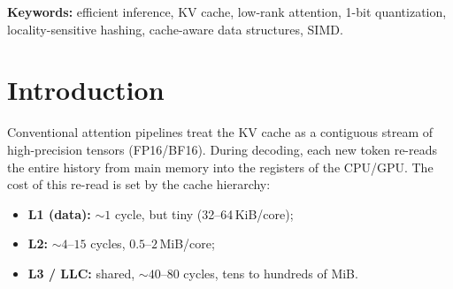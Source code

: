 \documentclass[11pt]{article}
\newcommand{\added}[1]{\textcolor{revisionblue}{#1}}
\newcommand{\deleted}[1]{\textcolor{revisionred}{#1}}
\theoremstyle{plain}
\theoremstyle{definition}
\begin{document}
\begin{abstract}
that lifts \textsc{warm} Spearman from $0.16$ to $0.86$ under query/key
distribution shift. A controlled ablation shows that quantization width
is \emph{not} the bottleneck (an INT8 reference does not beat INT4 on the
coarse term)---the low-rank projection is.
\added{Subsequent real-model evaluation materially revises the June draft.
On Qwen2.5-1.5B-Instruct Q8\_0 with WikiText-2 (12 chunks, context 512),
strict compressed-score replacement raised mean perplexity from 11.8831
for the matched no-substitution control to 16.9173 (+42.36\%), so that
configuration is an explicit end-to-end NO-GO. On a separate 24.41M
parameter TinyStories model with physical external-K CCOS, a repository-authored
two-chunk held-out control measured 42.201 baseline perplexity versus
49.0024 (+16.12\%) under SLHA/CCOS, with full active replacement coverage
and no fallback. A non-deployable rank-transplant diagnostic then showed
that restoring baseline key ordering while retaining SLHA score values
recovers 65.9\% of the Qwen quality gap; restoring only the baseline top-16
ordering captures 98.42\% of that oracle recovery.}
We position SLHA~v2 as a validated \emph{mechanism} and a systems substrate,
\deleted{and we are explicit about what remains unmeasured: real-model
perplexity, hardware cache counters, and joint projection training.}
\added{but no longer as a system whose synthetic fidelity proxies justify
end-to-end quality: real-model perplexity is now measured and currently
rejects the tested score-replacement configurations. Hardware cache counters,
production-scale GPU behavior, and a deployable ranking-preserving projection
remain open.}
\end{abstract}

\noindent\textbf{Keywords:} efficient inference, KV cache, low-rank
attention, 1-bit quantization, locality-sensitive hashing, cache-aware
data structures, SIMD.

\section{Introduction}
\label{sec:intro}

Conventional attention pipelines treat the KV cache as a contiguous
stream of high-precision tensors (FP16/BF16). During decoding, each new
token re-reads the entire history from main memory into the registers of
the CPU/GPU. The cost of this re-read is set by the cache hierarchy:

\begin{itemize}[leftmargin=1.4em,itemsep=2pt]
  \item \textbf{L1 (data):} $\sim\!1$ cycle, but tiny (32--64\,KiB/core);
  \item \textbf{L2:} $\sim\!4$--$15$ cycles, $0.5$--$2$\,MiB/core;
  \item \textbf{L3 / LLC:} shared, $\sim\!40$--$80$ cycles, tens to
    hundreds of MiB.
\end{itemize}
\end{document}
